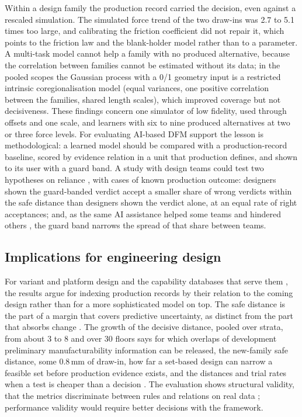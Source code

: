 \documentclass[pdflatex,sn-basic,lineno]{sn-jnl}
\begin{document}
Within a design family the production record carried the decision, even against a rescaled simulation. The simulated force trend of the two draw-ins was 2.7 to 5.1 times too large, and calibrating the friction coefficient did not repair it, which points to the friction law and the blank-holder model rather than to a parameter. A multi-task model cannot help a family with no produced alternative, because the correlation between families cannot be estimated without its data; in the pooled scopes the Gaussian process with a 0/1 geometry input is a restricted intrinsic coregionalisation model (equal variances, one positive correlation between the families, shared length scales), which improved coverage but not decisiveness. These findings concern one simulator of low fidelity, used through offsets and one scale, and learners with six to nine produced alternatives at two or three force levels. For evaluating AI-based DFM support the lesson is methodological: a learned model should be compared with a production-record baseline, scored by evidence relation in a unit that production defines, and shown to its user with a guard band. A study with design teams could test two hypotheses on reliance \citep{lee2004trust}, with cases of known production outcome: designers shown the guard-banded verdict accept a smaller share of wrong verdicts within the safe distance than designers shown the verdict alone, at an equal rate of right acceptances; and, as the same AI assistance helped some teams and hindered others \citep{zhang2021cautionary}, the guard band narrows the spread of that share between teams.

\subsection{Implications for engineering design}

For variant and platform design \citep{pahl2007engineering, simpson2006product} and the capability databases that serve them \citep{tata1999process, thornton2004variation}, the results argue for indexing production records by their relation to the coming design rather than for a more sophisticated model on top. The safe distance is the part of a margin that covers predictive uncertainty, as distinct from the part that absorbs change \citep{eckert2017safety, eckert2019design}. The growth of the decisive distance, pooled over strata, from about 3 to 8 and over 30 floors says for which overlaps of development \citep{krishnan1997model, terwiesch2002exchanging} preliminary manufacturability information can be released, the new-family safe distance, some 0.8\,mm of draw-in, how far a set-based design \citep{sobek1999toyota} can narrow a feasible set before production evidence exists, and the distances and trial rates when a test is cheaper than a decision \citep{thomke2001sequential, salado2018mathematical}. The evaluation shows structural validity, that the metrics discriminate between rules and relations on real data \citep{seepersad2006validation}; performance validity would require better decisions with the framework.
\end{document}
